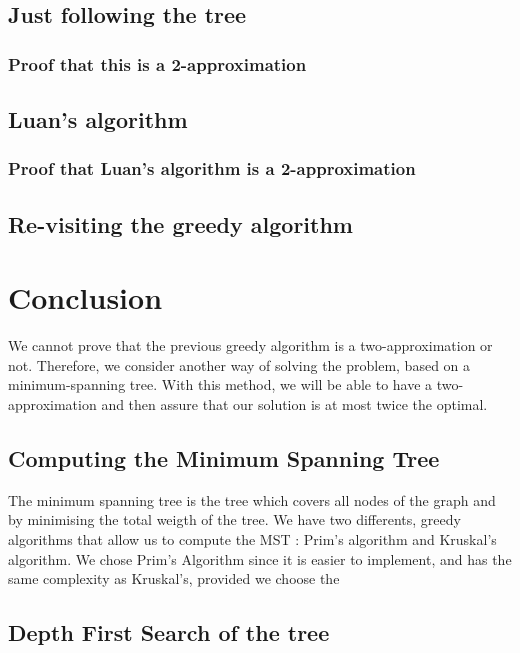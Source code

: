\documentclass[11pt]{article}
\begin{document}
\subsection{Just following the tree}
\subsubsection{Proof that this is a 2-approximation}

\subsection{Luan's algorithm}

\subsubsection{Proof that Luan's algorithm is a 2-approximation}


\subsection{Re-visiting the greedy algorithm}



\section{Conclusion}


We cannot prove that the previous greedy algorithm is a two-approximation or not. Therefore, we consider another way of solving the problem, based on a minimum-spanning tree. With this method, we will be able to have a two-approximation and then assure that our solution is at most twice the optimal.

\subsection{Computing the Minimum Spanning Tree}

The minimum spanning tree is the tree which covers all nodes of the graph and by minimising the total weigth of the tree.
We have two differents, greedy algorithms that allow us to compute the MST : Prim's algorithm and Kruskal's algorithm. We chose Prim's Algorithm since it is easier to implement, and has the same complexity as Kruskal's, provided we choose the

\subsection{Depth First Search of the tree}

\end{document}
